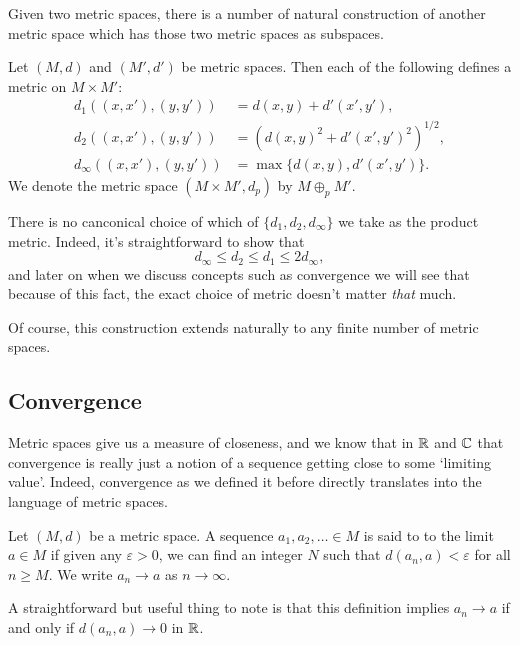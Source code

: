 \documentclass[a4paper]{scrartcl}
\begin{document}
Given two metric spaces, there is a number of natural construction of another metric space which has those two metric spaces as subspaces.

\begin{definition}    
    Let $(M, d)$ and $(M', d')$ be metric spaces. Then each of the following defines a metric on $M \times M'$:
    \begin{align*}
        d_1((x, x'), (y, y')) &= d(x, y) + d'(x', y') ,\\
        d_2((x, x'), (y, y')) &= \left(d(x, y)^2 + d'(x', y')^2\right)^{1/2} ,\\
        d_{\infty}((x, x'), (y, y')) &= \max\{d(x, y), d'(x', y')\}.
    \end{align*}
    We denote the metric space $(M \times M', d_p)$ by $M \oplus_p M'$.
\end{definition}

\begin{remark}
    There is no canconical choice of which of $\{d_1, d_2, d_{\infty}\}$ we take as the product metric. Indeed, it's straightforward to show that
    $$
    d_{\infty} \leq d_2 \leq d_1 \leq 2 d_{\infty},
    $$
    and later on when we discuss concepts such as convergence we will see that because of this fact, the exact choice of metric doesn't matter \emph{that} much.
\end{remark}

Of course, this construction extends naturally to any finite number of metric spaces.

\subsection{Convergence}

Metric spaces give us a measure of closeness, and we know that in $\mathbb{R}$ and $\mathbb{C}$ that convergence is really just a notion of a sequence getting close to some `limiting value'. Indeed, convergence as we defined it before directly translates into the language of metric spaces.

\begin{definition}[Convergence]
    Let $(M, d)$ be a metric space. A sequence $a_1, a_2, \dots \in M$ is said to  to the limit $a \in M$ if given any $\varepsilon > 0$, we can find an integer $N$ such that $d(a_n, a) < \varepsilon$ for all $n \geq M$. We write $a_n \rightarrow a$ as $n \rightarrow \infty$.
\end{definition}

A straightforward but useful thing to note is that this definition implies $a_n \rightarrow a$ if and only if $d(a_n, a) \rightarrow 0$ in $\mathbb{R}$.
\end{document}
